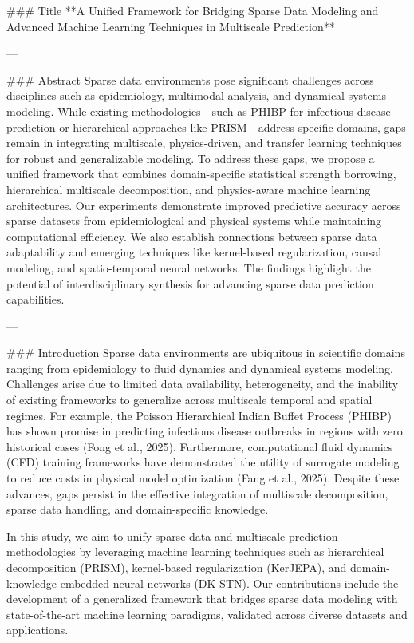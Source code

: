 ### Title  
**A Unified Framework for Bridging Sparse Data Modeling and Advanced Machine Learning Techniques in Multiscale Prediction**

---

### Abstract  
Sparse data environments pose significant challenges across disciplines such as epidemiology, multimodal analysis, and dynamical systems modeling. While existing methodologies—such as PHIBP for infectious disease prediction or hierarchical approaches like PRISM—address specific domains, gaps remain in integrating multiscale, physics-driven, and transfer learning techniques for robust and generalizable modeling. To address these gaps, we propose a unified framework that combines domain-specific statistical strength borrowing, hierarchical multiscale decomposition, and physics-aware machine learning architectures. Our experiments demonstrate improved predictive accuracy across sparse datasets from epidemiological and physical systems while maintaining computational efficiency. We also establish connections between sparse data adaptability and emerging techniques like kernel-based regularization, causal modeling, and spatio-temporal neural networks. The findings highlight the potential of interdisciplinary synthesis for advancing sparse data prediction capabilities.

---

### Introduction  
Sparse data environments are ubiquitous in scientific domains ranging from epidemiology to fluid dynamics and dynamical systems modeling. Challenges arise due to limited data availability, heterogeneity, and the inability of existing frameworks to generalize across multiscale temporal and spatial regimes. For example, the Poisson Hierarchical Indian Buffet Process (PHIBP) has shown promise in predicting infectious disease outbreaks in regions with zero historical cases (Fong et al., 2025). Furthermore, computational fluid dynamics (CFD) training frameworks have demonstrated the utility of surrogate modeling to reduce costs in physical model optimization (Fang et al., 2025). Despite these advances, gaps persist in the effective integration of multiscale decomposition, sparse data handling, and domain-specific knowledge.

In this study, we aim to unify sparse data and multiscale prediction methodologies by leveraging machine learning techniques such as hierarchical decomposition (PRISM), kernel-based regularization (KerJEPA), and domain-knowledge-embedded neural networks (DK-STN). Our contributions include the development of a generalized framework that bridges sparse data modeling with state-of-the-art machine learning paradigms, validated across diverse datasets and applications.

